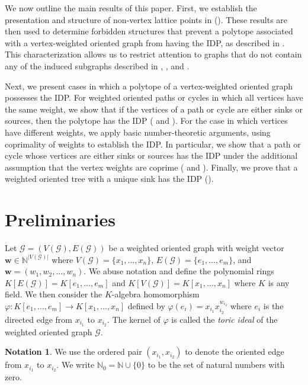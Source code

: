 \documentclass [12pt,a4paper,reqno]{amsart}
\theoremstyle{plain}
\theoremstyle{definition}
\newtheorem{Assumptions and Discussion}[Theorem]{Assumptions and Discussion}
\newtheorem{Notation}[Theorem]{Notation}
\theoremstyle{remark}
\def\NN{{\mathbb N}}
\newcommand\bdw{{\bm w}}
\newcommand\calG{\mathcal{G}}
\begin{document}
We now outline the main results of this paper. First, we establish the presentation and structure of non-vertex lattice points in  (). These results are then used to determine forbidden structures that prevent a polytope associated with a vertex-weighted oriented graph from having the IDP, as described in . This characterization allows us to restrict attention to graphs that do not contain any of the induced subgraphs described in , , and .

Next, we present cases in which a polytope of a vertex-weighted oriented graph possesses the IDP. For weighted oriented paths or cycles in which all vertices have the same weight, we show that if the vertices of a path or cycle are either sinks or sources, then the polytope has the IDP ( and ). For the case in which vertices have different weights, we apply basic number-theoretic arguments, using coprimality of weights to establish the IDP. In particular, we show that a path or cycle whose vertices are either sinks or sources has the IDP under the additional assumption that the vertex weights are coprime ( and ). Finally, we prove that a weighted oriented tree with a unique sink has the IDP ().



\section{Preliminaries}\label{Sec:Pre}

Let $\calG=(V(\calG), E(\calG))$ be a weighted oriented graph with weight vector $\bdw\in  \mathbb{N}^{|V(\calG)|}$ where $V(\calG)=\{x_1,\dots,x_n\}$, $E(\calG)=\{e_1,\dots,e_m\}$, and $\bdw=(w_1,w_2,\dots,w_n)$. We abuse notation and define the polynomial rings $K[E(\calG)]=K[e_1,\dots,e_m]$ and $K[V(\calG)]=K[x_1,\dots,x_n]$ where $K$ is any field. We then consider the $K$-algebra homomorphism $\varphi: K[e_1,\dots,e_m]\rightarrow K[x_1,\dots,x_n]$ defined by $\varphi(e_i)=x_{i_1}x_{i_2}^{w_{i_2}}$ 
where $e_i$ is the directed edge from $x_{i_1}$ to $x_{i_2}$.  The kernel of $\varphi$ is called the \emph{toric ideal} of the weighted oriented graph $\calG$.

\begin{Notation}
    We use the ordered pair $(x_{i_1},x_{i_2})$ to denote the oriented edge from $x_{i_1}$ to $x_{i_2}$. 
    We write $\NN_0=\NN \cup \{0\}$ to be the set of natural numbers with zero.
\end{Notation}
\end{document}
